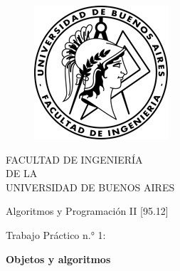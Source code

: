 \documentclass[12pt,a4paper]{report}
\begin{document}
	
	\begin{titlepage}

	\begin{center}

		\vspace*{0.2mm}
			\begin{figure}[htp]
				\begin{center}
					\includegraphics[scale=1]{logo1.jpg} 
				\end{center}
			\end{figure} 

			FACULTAD DE INGENIERÍA \\
			DE LA \\
			UNIVERSIDAD DE BUENOS AIRES\\
		
		\vspace*{0.20in}
	
			\begin{Large}
				Algoritmos y Programación II [95.12]\\
			\end{Large}	
			
		\vspace*{1cm}
	
			\begin{huge}
				Trabajo Práctico n.° 1:\\
			\end{huge}
		
		\vspace*{0.75cm}
	
			\begin{Huge}
				\textbf{Objetos y algoritmos} \\
			\end{Huge}
		
		\vspace*{1.75cm}
		
		
				

\end{center}
\end{titlepage}
\end{document}
